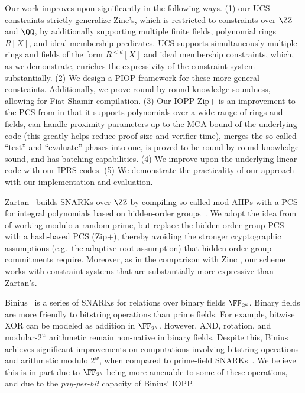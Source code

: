 Our work improves upon \cite{Zinc} significantly in the following ways. (1) our UCS constraints strictly generalize Zinc's, which is restricted to constraints over $\ZZ$ and $\QQ$, by additionally supporting multiple finite fields, polynomial rings $R[X]$, and ideal-membership predicates. UCS supports simultaneously multiple rings and fields of the form $R^{<d}[X]$ and ideal membership constraints, which, as we demonstrate, enriches the expressivity of the constraint system substantially. (2) We design a PIOP framework for these more general constraints.  Additionally, we prove round-by-round knowledge soundness, allowing for Fiat-Shamir compilation. (3) Our IOPP Zip$+$ is an improvement to the PCS from \cite{Zinc} in that it supports polynomials over a wide range of rings and fields, can handle proximity parameters up to the MCA bound of the underlying code (this greatly helps reduce proof size and verifier time), merges the so-called ``test'' and ``evaluate'' phases into one, is proved to be round-by-round knowledge sound, and has batching capabilities. (4) We improve upon the underlying linear code with our IPRS codes. (5) We demonstrate the practicality of our approach with our implementation and evaluation.

Zartan~\cite{Zartan} builds SNARKs over $\ZZ$ by compiling so-called mod-AHPs with a PCS for integral polynomials based on hidden-order groups~\cite{BlockDARK,BunzFisch22}. %
We adopt the idea from~\cite{Zartan} of working modulo a random prime, but replace the hidden-order-group PCS with a hash-based PCS (Zip$+$), thereby avoiding the stronger cryptographic assumptions (e.g.\ the adaptive root assumption) that hidden-order-group commitments require. Moreover, as in the comparison with Zinc \cite{Zinc}, our scheme works with constraint systems that are substantially more expressive than Zartan's.


Binius~\cite{EC:DiaPos25,EPRINT:DiaPos24} is a series of SNARKs for relations over binary fields $\FF_{2^k}$. Binary fields are more friendly to bitstring operations than prime fields. For example, bitwise XOR can be modeled as addition in  $\FF_{2^k}$. However, AND, rotation, and modular-$2^w$ arithmetic remain non-native in binary fields. Despite this, Binius achieves significant improvements on computations involving bitstring operations and arithmetic modulo $2^w$, when compared to prime-field SNARKs~\cite{ethproofs}. We believe this is in part due to $\FF_{2^k}$ being more amenable to some of these operations, and due to the \emph{pay-per-bit} capacity of Binius' IOPP. 

